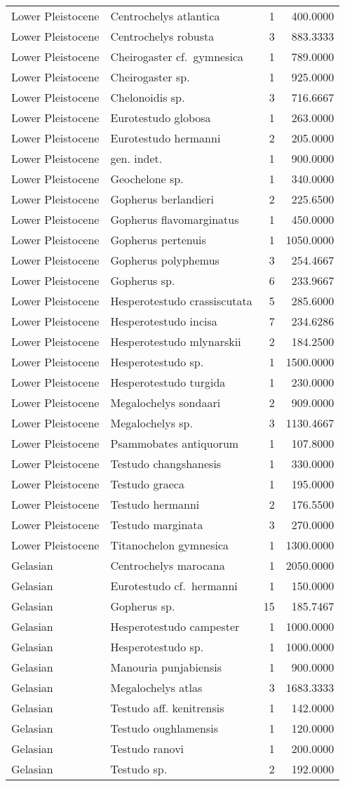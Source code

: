 \begin{longtable}[]{@{}llrr@{}}
	Lower Pleistocene & Centrochelys atlantica & 1 & 400.0000\tabularnewline
	Lower Pleistocene & Centrochelys robusta & 3 & 883.3333\tabularnewline
	Lower Pleistocene & Cheirogaster cf.~gymnesica & 1 &
	789.0000\tabularnewline
	Lower Pleistocene & Cheirogaster sp. & 1 & 925.0000\tabularnewline
	Lower Pleistocene & Chelonoidis sp. & 3 & 716.6667\tabularnewline
	Lower Pleistocene & Eurotestudo globosa & 1 & 263.0000\tabularnewline
	Lower Pleistocene & Eurotestudo hermanni & 2 & 205.0000\tabularnewline
	Lower Pleistocene & gen. indet. & 1 & 900.0000\tabularnewline
	Lower Pleistocene & Geochelone sp. & 1 & 340.0000\tabularnewline
	Lower Pleistocene & Gopherus berlandieri & 2 & 225.6500\tabularnewline
	Lower Pleistocene & Gopherus flavomarginatus & 1 &
	450.0000\tabularnewline
	Lower Pleistocene & Gopherus pertenuis & 1 & 1050.0000\tabularnewline
	Lower Pleistocene & Gopherus polyphemus & 3 & 254.4667\tabularnewline
	Lower Pleistocene & Gopherus sp. & 6 & 233.9667\tabularnewline
	Lower Pleistocene & Hesperotestudo crassiscutata & 5 &
	285.6000\tabularnewline
	Lower Pleistocene & Hesperotestudo incisa & 7 & 234.6286\tabularnewline
	Lower Pleistocene & Hesperotestudo mlynarskii & 2 &
	184.2500\tabularnewline
	Lower Pleistocene & Hesperotestudo sp. & 1 & 1500.0000\tabularnewline
	Lower Pleistocene & Hesperotestudo turgida & 1 & 230.0000\tabularnewline
	Lower Pleistocene & Megalochelys sondaari & 2 & 909.0000\tabularnewline
	Lower Pleistocene & Megalochelys sp. & 3 & 1130.4667\tabularnewline
	Lower Pleistocene & Psammobates antiquorum & 1 & 107.8000\tabularnewline
	Lower Pleistocene & Testudo changshanesis & 1 & 330.0000\tabularnewline
	Lower Pleistocene & Testudo graeca & 1 & 195.0000\tabularnewline
	Lower Pleistocene & Testudo hermanni & 2 & 176.5500\tabularnewline
	Lower Pleistocene & Testudo marginata & 3 & 270.0000\tabularnewline
	Lower Pleistocene & Titanochelon gymnesica & 1 &
	1300.0000\tabularnewline
	Gelasian & Centrochelys marocana & 1 & 2050.0000\tabularnewline
	Gelasian & Eurotestudo cf.~hermanni & 1 & 150.0000\tabularnewline
	Gelasian & Gopherus sp. & 15 & 185.7467\tabularnewline
	Gelasian & Hesperotestudo campester & 1 & 1000.0000\tabularnewline
	Gelasian & Hesperotestudo sp. & 1 & 1000.0000\tabularnewline
	Gelasian & Manouria punjabiensis & 1 & 900.0000\tabularnewline
	Gelasian & Megalochelys atlas & 3 & 1683.3333\tabularnewline
	Gelasian & Testudo aff. kenitrensis & 1 & 142.0000\tabularnewline
	Gelasian & Testudo oughlamensis & 1 & 120.0000\tabularnewline
	Gelasian & Testudo ranovi & 1 & 200.0000\tabularnewline
	Gelasian & Testudo sp. & 2 & 192.0000\tabularnewline

\end{longtable}
